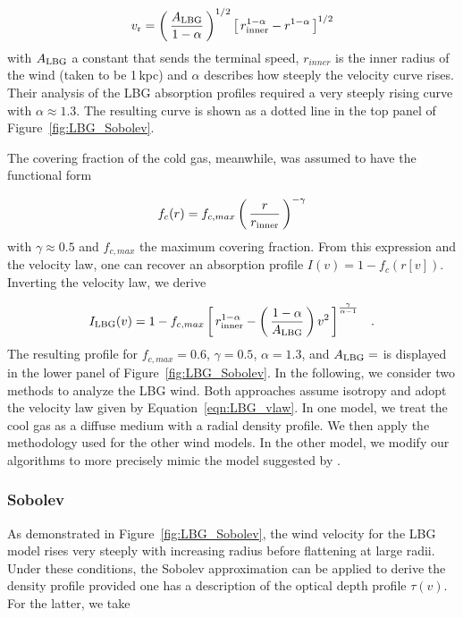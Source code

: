 \documentclass[12pt,preprint]{aastex}
\begin{document}
\begin{equation}
v_{\rm r} = \left ( \, \frac{A_{\rm LBG}}{1-\alpha} \, \right )^{1/2} \left [ \, r_{\rm
  inner}^{1-\alpha} - r^{1-\alpha} \, \right ]^{1/2}
\label{eqn:LBG_vlaw}
\end{equation}
with $A_{\rm LBG}$ a constant that sends the terminal speed,
$r_{inner}$ is the inner radius of the wind (taken to be 1\,kpc) and
$\alpha$ describes how steeply the velocity curve rises.  Their
analysis of the LBG absorption profiles required
a very steeply rising curve with $\alpha \approx 1.3$.
The resulting curve is shown as a dotted line in the top panel of
Figure~\ref{fig:LBG_Sobolev}.  

The covering fraction of the cold gas, meanwhile, was assumed to have
the functional form

\begin{equation}
f_c(r) = f_{c,max} \left ( \, \frac{r}{r_{\rm inner}} \, \right )^{-\gamma}
\label{eqn:covering}
\end{equation}
with $\gamma \approx 0.5$ and $f_{c,max}$ the maximum covering
fraction.  From this expression and the velocity law, one can recover
an absorption profile $I(v) = 1 - f_c(r[v])$.  Inverting the velocity
law, we derive

\begin{equation}
I_{\rm LBG}(v) = 1 - f_{c,max} \left [ \, r_{\rm inner}^{1-\alpha} - \left ( \,
\frac{1-\alpha}{A_{\rm LBG}} \, \right ) v^2 \, \right ]^{\frac{\gamma}{\alpha-1}}
\;\;\; .
\label{eqn:LBG_I}
\end{equation}
The resulting profile for $f_{c,max} = 0.6$, $\gamma=0.5$,
$\alpha=1.3$, and $A_{\rm LBG} = $ is displayed in the lower panel of
Figure~\ref{fig:LBG_Sobolev}.  
In the following, we consider two methods to analyze the LBG wind.
Both approaches assume isotropy and adopt the velocity law given by
Equation~\ref{eqn:LBG_vlaw}.  In one model, we treat the cool gas as a
diffuse medium with a radial density profile.  We then apply 
the methodology used for the other wind models.  In the other model,
we modify our algorithms to more precisely mimic the model suggested
by \cite{steidel+10}.

\subsubsection{Sobolev}
\label{sec:Sobolev}

As demonstrated in Figure~\ref{fig:LBG_Sobolev}, the wind velocity for
the LBG model rises very steeply with increasing radius before
flattening at large radii.  Under these conditions, the Sobolev
approximation can be applied to derive the density profile provided
one has a description of the optical depth profile $\tau(v)$.
For the latter, we take
\end{document}
